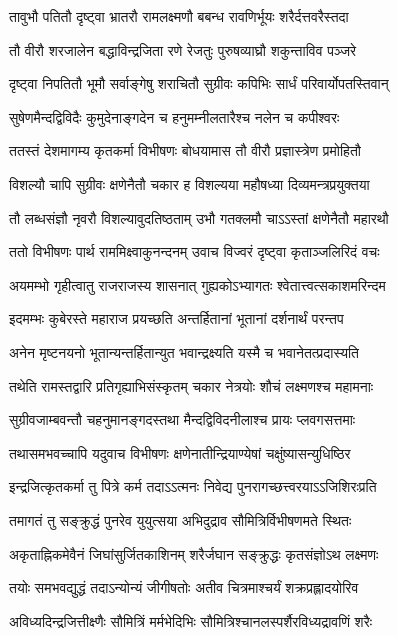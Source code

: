 \twolineshloka
{तावुभौ पतितौ दृष्ट्वा भ्रातरौ रामलक्ष्मणौ}
{बबन्ध रावणिर्भूयः शरैर्दत्तवरैस्तदा}


\twolineshloka
{तौ वीरौ शरजालेन बद्धाविन्द्रजिता रणे}
{रेजतुः पुरुषव्याघ्रौ शकुन्ताविव पञ्जरे}


\twolineshloka
{दृष्ट्वा निपतितौ भूमौ सर्वाङ्गेषु शराचितौ}
{सुग्रीवः कपिभिः सार्धं परिवार्योपतस्तिवान्}


\twolineshloka
{सुषेणमैन्दद्विविदैः कुमुदेनाङ्गदेन च}
{हनुमम्नीलतारैश्च नलेन च कपीश्वरः}


\twolineshloka
{ततस्तं देशमागम्य कृतकर्मा विभीषणः}
{बोधयामास तौ वीरौ प्रज्ञास्त्रेण प्रमोहितौ}


\twolineshloka
{विशल्यौ चापि सुग्रीवः क्षणेनैतौ चकार ह}
{विशल्यया महौषध्या दिव्यमन्त्रप्रयुक्तया}


\twolineshloka
{तौ लब्धसंज्ञौ नृवरौ विशल्यावुदतिष्ठताम्}
{उभौ गतक्लमौ चाऽऽस्तां क्षणेनैतौ महारथौ}


\twolineshloka
{ततो विभीषणः पार्थ राममिक्ष्वाकुनन्दनम्}
{उवाच विज्वरं दृष्ट्वा कृताञ्जलिरिदं वचः}


\twolineshloka
{अयमम्भो गृहीत्वातु राजराजस्य शासनात्}
{गुह्यकोऽभ्यागतः श्वेतात्त्वत्सकाशमरिन्दम}


\twolineshloka
{इदमम्भः कुबेरस्ते महाराज प्रयच्छति}
{अन्तर्हितानां भूतानां दर्शनार्थं परन्तप}


\twolineshloka
{अनेन मृष्टनयनो भूतान्यन्तर्हितान्युत}
{भवान्द्रक्ष्यति यस्मै च भवानेतत्प्रदास्यति}


\twolineshloka
{तथेति रामस्तद्वारि प्रतिगृह्याभिसंस्कृतम्}
{चकार नेत्रयोः शौचं लक्ष्मणश्च महामनाः}


\twolineshloka
{सुग्रीवजाम्बवन्तौ चहनुमानङ्गदस्तथा}
{मैन्दद्विविदनीलाश्च प्रायः प्लवगसत्तमाः}


\twolineshloka
{तथासमभवच्चापि यदुवाच विभीषणः}
{क्षणेनातीन्द्रियाण्येषां चक्षुंष्यासन्युधिष्ठिर}


\twolineshloka
{इन्द्रजित्कृतकर्मा तु पित्रे कर्म तदाऽऽत्मनः}
{निवेद्य पुनरागच्छत्त्वरयाऽऽजिशिरःप्रति}


\twolineshloka
{तमागतं तु सङ्क्रुद्धं पुनरेव युयुत्सया}
{अभिदुद्राव सौमित्रिर्विभीषणमते स्थितः}


\twolineshloka
{अकृताह्निकमेवैनं जिघांसुर्जितकाशिनम्}
{शरैर्जघान सङ्क्रुद्धः कृतसंज्ञोऽथ लक्ष्मणः}


\twolineshloka
{तयोः समभवद्युद्धं तदाऽन्योन्यं जीगीषतोः}
{अतीव चित्रमाश्चर्यं शक्रप्रह्लादयोरिव}


\twolineshloka
{अविध्यदिन्द्रजित्तीक्ष्णैः सौमित्रिं मर्मभेदिभिः}
{सौमित्रिश्चानलस्पर्शैरविध्यद्रावणिं शरैः}


